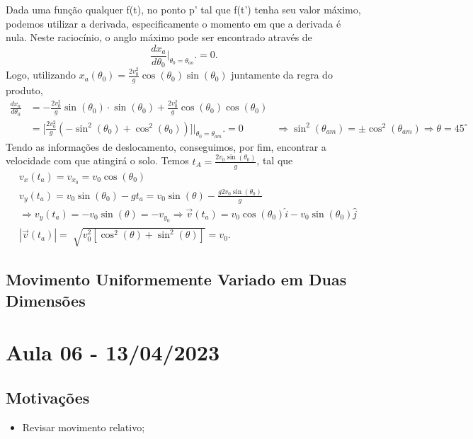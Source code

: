\documentclass{article}
\begin{document}
    Dada uma função qualquer f(t), no ponto p' tal que f(t') tenha seu valor máximo, podemos utilizar a derivada, especificamente
    o momento em que a derivada é nula. Neste raciocínio, o anglo máximo pode ser encontrado através de 
      $$
        \frac{dx_{a}}{d\theta _{0}} \biggl|_{\theta_{0}=\theta_{ao}}^{}\biggr. = 0.
      $$
    Logo, utilizando $x_{a}(\theta_{0}) = \frac{2v_{0}^{2}}{g}\cos{(\theta_{0})}\sin{(\theta_{0})}$ juntamente da regra do produto,
   \begin{align*}
     \frac{dx_{a}}{d\theta _{0}} &= -\frac{2v_{0}^{2}}{g}\sin{(\theta_{0})}\cdot \sin{(\theta_{0})} + \frac{2v_{0}^{2}}{g}\cos{(\theta_{0})}\cos{(\theta_{0})}\\
                                 &= \biggl[\frac{2v_{0}^{2}}{g}(-\sin^{2}{(\theta_{0})}+\cos^{2}{(\theta_{0})})\biggr]\biggl|_{\theta_{0}=\theta_{am}}^{}\biggr. = 0
                                 &\Rightarrow \sin^{2}{(\theta_{am})}=\pm\cos^{2}{(\theta_{am})} \Rightarrow \boxed{\theta =45^{\circ}}
   \end{align*}
    Tendo as informações de deslocamento, conseguimos, por fim, encontrar a velocidade com que atingirá o solo. Temos
    $t_{A} = \frac{2v_{0}\sin{(\theta_{0})}}{g}$, tal que 
   \begin{align*}
     &v_{x}(t_{a}) = v_{x_{0}} = v_{0}\cos{(\theta_{0})}\\
     &v_{y}(t_{a}) = v_{0}\sin{(\theta_{0})}-gt_{a} = v_{0}\sin{(\theta )} - \frac{g2v_{0}\sin{(\theta _0)}}{g}\\
     &\Rightarrow  v_{y}(t_{a}) = -v_{0}\sin{(\theta )} = -v_{y_{0}} \Rightarrow \vec{v}(t_{a}) = v_{0}\cos{(\theta_{0})}\hat{i} - v_{0}\sin{(\theta_{0})}\hat{j} \\
     & |\vec{v}(t_{a})| = \sqrt[]{v_{0}^{2}[\cos^{2}{(\theta )}+\sin^{2}{(\theta )}]} = v_{0}.
   \end{align*}

   \subsection{Movimento Uniformemente Variado em Duas Dimensões}


\newpage
\section{Aula 06 - 13/04/2023}
\subsection{Motiva\c c\~oes}
\begin{itemize}
\item Revisar movimento relativo;
\end{itemize}
\end{document}
